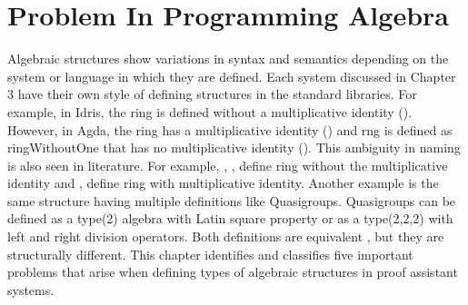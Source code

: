 \chapter{Problem In Programming Algebra}
Algebraic structures show variations in syntax and semantics depending on the
system or language in which they are defined. Each system discussed in Chapter 3
have their own style of defining structures in the standard libraries. For
example, in Idris, the ring is defined without a multiplicative identity
().
However, in Agda, the ring has a multiplicative identity
()
and rng is defined as ringWithoutOne that has no multiplicative identity
().
This ambiguity in naming is also seen in literature. For example,
\cite{anh1987morita}, \cite{jacobson1956structure},
\cite{persson1999application} define ring without the multiplicative identity
and \cite{lehmann1977algebraic}, \cite{geuvers2002constructive} define ring with
multiplicative identity. Another example is the same structure having multiple
definitions like Quasigroups. Quasigroups can be defined as a type(2) algebra
with Latin square property or as a type(2,2,2) with left and right division
operators. Both definitions are equivalent \cite{shcherbacov2003elements}, but
they are structurally different. This chapter identifies and classifies five
important problems that arise when defining types of algebraic structures in
proof assistant systems.

